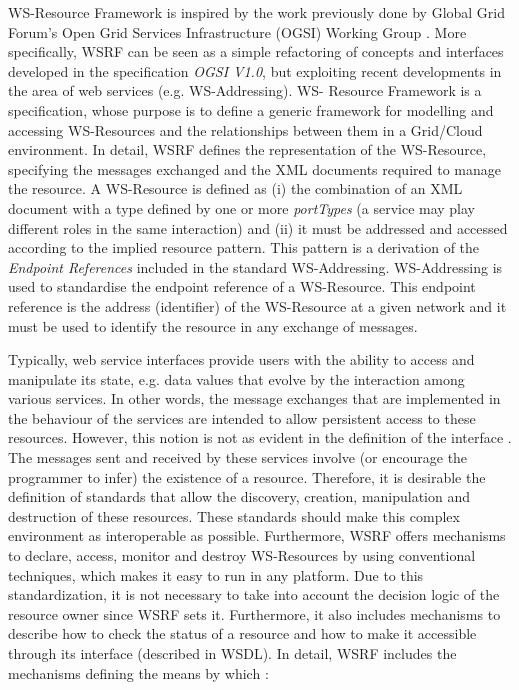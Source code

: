 WS-Resource Framework is inspired by the work previously done by Global Grid Forum's 
Open Grid Services Infrastructure (OGSI) Working Group \cite{Foster03}. More specifically,
WSRF can be seen as a simple refactoring of concepts and interfaces 
developed in the specification \emph{OGSI V1.0}, but
exploiting recent developments in the area of web services (e.g. WS-Addressing). 
WS- Resource Framework \cite{BAN06} is a specification, whose purpose is to define a 
generic framework for modelling and accessing WS-Resources and the relationships 
between them in a Grid/Cloud environment. In detail, WSRF defines 
the representation of the WS-Resource, specifying the messages exchanged and 
the XML documents required to manage the resource. 
A WS-Resource is defined as (i) the combination of an XML document with a type defined
by one or more \emph{portTypes} (a service may play different roles in the same interaction) and (ii) it must 
be addressed and accessed according to the implied resource pattern. This pattern is a derivation 
of the \emph{Endpoint References} included in the standard WS-Addressing. 
WS-Addressing is used to standardise the endpoint reference  of a WS-Resource. This endpoint
reference is the address (identifier) of the WS-Resource at
a given network and it must be used to identify the resource in any exchange of messages. 

Typically, web service interfaces provide users with the ability to access and manipulate its state, e.g. data values
that evolve by the interaction among various services. In other words, 
the message exchanges that are implemented in the behaviour of the services 
are intended to allow persistent access to these resources. However, this notion is not 
as evident in the definition of the interface \cite{Fost04}. The messages sent and received 
by these services involve (or encourage the programmer to infer) the existence of a resource. 
Therefore, it is desirable the definition of standards that allow the discovery, 
creation, manipulation and destruction of these resources. These standards should make this 
complex environment as interoperable as possible. Furthermore, 
WSRF offers mechanisms to declare, access, monitor and destroy WS-Resources by using conventional techniques, 
which makes it easy to run in any platform. Due to this standardization, 
it is not necessary to take into account the decision logic of the resource owner since WSRF sets it.
Furthermore, it also includes mechanisms to describe how to check the status of a resource 
and how to make it accessible through its interface (described in WSDL). 
In detail, WSRF includes the mechanisms defining the means by which \cite{}:

